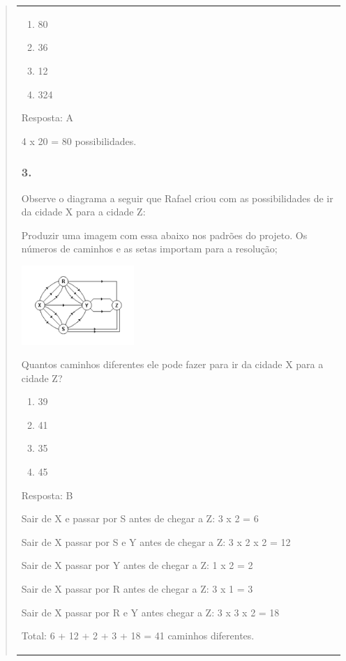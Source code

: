 \begin{enumerate}
\begin{escolha}
\begin{enumerate}
\begin{itemize}
\begin{itemize}
\begin{escolha}
\begin{quote}
\begin{escolha}
{\begin{longtable}[]{@{}l@{}}
\begin{itemize}
\begin{enumerate}
\def\labelenumi{\alph{enumi})}
\item
  80
\item
  36
\item
  12
\item
  324
\end{enumerate}

Resposta: A

4 x 20 = 80 possibilidades.

\subsubsection{3.}\label{section-142}

Observe o diagrama a seguir que Rafael criou com as possibilidades de ir
da cidade X para a cidade Z:

Produzir uma imagem com essa abaixo nos padrões do projeto. \textbar{}Os
números de caminhos e as setas importam para a resolução;

\includegraphics[width=1.68348in,height=1.18344in]{media/image141.png}

Quantos caminhos diferentes ele pode fazer para ir da cidade X para a
cidade Z?

\begin{enumerate}
\def\labelenumi{\alph{enumi})}
\item
  39
\item
  41
\item
  35
\item
  45
\end{enumerate}

Resposta: B

Sair de X e passar por S antes de chegar a Z: 3 x 2 = 6

Sair de X passar por S e Y antes de chegar a Z: 3 x 2 x 2 = 12

Sair de X passar por Y antes de chegar a Z: 1 x 2 = 2

Sair de X passar por R antes de chegar a Z: 3 x 1 = 3

Sair de X passar por R e Y antes chegar a Z: 3 x 3 x 2 = 18

Total: 6 + 12 + 2 + 3 + 18 = 41 caminhos diferentes.


\end{itemize}
\end{longtable}}
\end{escolha}
\end{quote}
\end{escolha}
\end{itemize}
\end{itemize}
\end{enumerate}
\end{escolha}
\end{enumerate}
